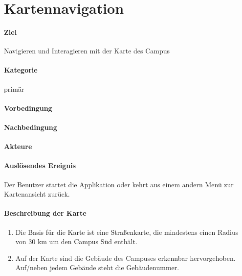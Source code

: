 \section{Kartennavigation}
\label{Kartennavigation}
\paragraph{Ziel}
Navigieren und Interagieren mit der Karte des Campus
\paragraph{Kategorie}
primär
\paragraph{Vorbedingung}

\paragraph{Nachbedingung}

\paragraph{Akteure}

\paragraph{Auslösendes Ereignis}
Der Benutzer startet die Applikation oder kehrt aus einem andern Menü zur Kartenansicht zurück.
\paragraph{Beschreibung der Karte}
\begin{enumerate}
    \item Die Basis für die Karte ist eine Straßenkarte, die mindestens einen Radius von 30 km um den Campus Süd enthält.
    \item Auf der Karte sind die Gebäude des Campuses erkennbar hervorgehoben. Auf/neben jedem Gebäude steht die Gebäudenummer.
\end{enumerate}

